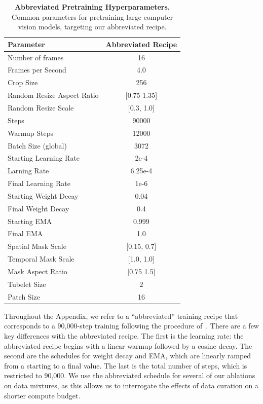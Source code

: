 \documentclass[]{fairmeta}
\begin{document}
\begin{table}[h]
    \small
    \caption{\small{\bf Abbreviated Pretraining Hyperparameters.} Common parameters for pretraining large computer vision models, targeting our abbreviated recipe.}
    \centering
    \label{tab:abbreviated_pretraining_params}
    \begin{tabular}{l c}
      \bf Parameter & \bf Abbreviated Recipe \\
        \toprule
        Number of frames & 16 \\
        Frames per Second & 4.0 \\
        Crop Size & 256 \\
        Random Resize Aspect Ratio & [0.75 1.35] \\
        Random Resize Scale & [0.3, 1.0] \\
        Steps & 90000 \\
        Warmup Steps & 12000 \\
        Batch Size (global) & 3072 \\
        Starting Learning Rate & 2e-4 \\
        Larning Rate & 6.25e-4 \\
        Final Learning Rate & 1e-6 \\
        Starting Weight Decay & 0.04 \\
        Final Weight Decay & 0.4 \\
        Starting EMA & 0.999 \\
        Final EMA & 1.0 \\
        Spatial Mask Scale & [0.15, 0.7] \\
        Temporal Mask Scale & [1.0, 1.0] \\
        Mask Aspect Ratio & [0.75 1.5] \\
        Tubelet Size & 2 \\
        Patch Size & 16 \\
        \bottomrule
    \end{tabular}
\end{table}
Throughout the Appendix, we refer to a ``abbreviated'' training recipe that corresponds to a 90,000-step training following the procedure of~\citet{bardes2024revisiting}.
There are a few key differences with the abbreviated recipe.
The first is the learning rate: the abbreviated recipe begins with a linear warmup followed by a cosine decay.
The second are the schedules for weight decay and EMA, which are linearly ramped from a starting to a final value.
The last is the total number of steps, which is restricted to 90,000.
We use the abbreviated schedule for several of our ablations on data mixtures, as this allows us to interrogate the effects of data curation on a shorter compute budget.
\end{document}

